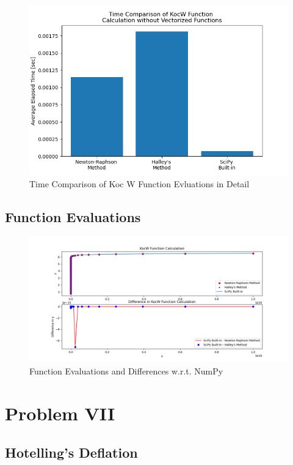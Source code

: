 \documentclass[letterpaper,12pt]{article}
\begin{document}
\begin{figure}[H] 
   \centering \includegraphics[width=0.7\columnwidth]{figures/kocwtimedetailed.png}           
                  \caption{Time Comparison of Koc W Function Evluations in Detail}                
                     \label{fig:koctimedetailed}
   \end{figure}
\subsection{Function Evaluations}

   
\begin{figure}[H] 
   \centering \includegraphics[width=\columnwidth]{figures/kocwfunceval.png}           
                  \caption{Function Evaluations and Differences w.r.t. NumPy}                
                     \label{fig:kocfunceval}
   \end{figure}
\pagebreak

\section{Problem  VII}
\subsection{Hotelling's Deflation}
\end{document}
